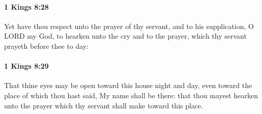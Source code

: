 		\paragraph{1 Kings 8:28} %
			\label{1KINGS-8-28}

			Yet have thou respect unto the prayer of thy servant, and to his supplication, O LORD my God, to hearken unto the cry and to the prayer, which thy servant prayeth before thee to day:


		\paragraph{1 Kings 8:29} %
			\label{1KINGS-8-29}

			That thine eyes may be open toward this house night and day, even toward the place of which thou hast said, My name shall be there: that thou mayest hearken unto the prayer which thy servant shall make toward this place.

